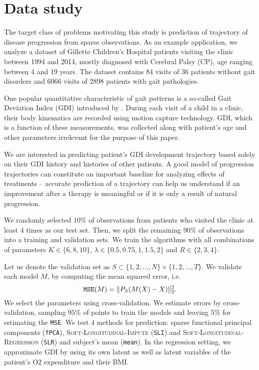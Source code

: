 \documentclass[preprint]{imsart}
\numberwithin{equation}{section}
\theoremstyle{plain}
\begin{document}
\section{Data study}

The target class of problems motivating this study is prediction of trajectory of disease progression from sparse observations. As an example application, we analyze a dataset of Gillette Children's Hospital patients visiting the clinic between 1994 and 2014, mostly diagnosed with Cerebral Palsy (CP), age ranging between 4 and 19 years. The dataset contains $84$ visits of $36$ patients without gait disorders and $6066$ visits of $2898$ patients with gait pathologies. 

One popular quantitative characteristic of gait patterns is a so-called Gait Deviation Index (GDI) introduced by \citet{schwartz2008gait}. During each visit of a child in a clinic, their body kinematics are recorded using motion capture technology. GDI, which is a function of these measurements, was collected along with patient's age and other parameters irrelevant for the purpose of this paper.

We are interested in predicting patient's GDI development trajectory based solely on their GDI history and histories of other patients. A good model of progression trajectories can constitute an important baseline for analyzing effects of treatments -- accurate prediction of a trajectory can help us understand if an improvement after a therapy is meaningful or if it is only a result of natural progression.

We randomly selected $10\%$ of observations from patients who visited the clinic at least $4$ times as our test set. Then, we split the remaining $90\%$ of observations into a training and validation sets. We train the algorithms with all combinations of parameters $K \in \{6,8,10\}$, $\lambda \in \{0.5, 0.75, 1, 1.5, 2\}$ and $R \in \{2,3,4\}$.

Let us denote the validation set as $S \subset \{1,2,...,N\} \times \{1,2,...,T\}$. We validate each model $M$, by computing the mean squared error, i.e.
\[
\verb|MSE|(M) = \|P_S(M(X) - X)\|_2^2.
\]
We select the parameters using cross-validation. We estimate errors by cross-validation, sampling $95\%$ of points to train the models and leaving $5\%$ for estimating the \verb|MSE|. We test $4$ methods for prediction: sparse functional principal components (\verb|fPCA|), \textsc{Soft-Longitudinal-Impute} (\verb|SLI|) and \textsc{Soft-Longitudinal-Regression} (\verb|SLR|) and subject's mean (\verb|mean|). In the regression setting, we approximate GDI by using its own latent as well as latent variables of the patient's O2 expenditure and their BMI.
\end{document}
